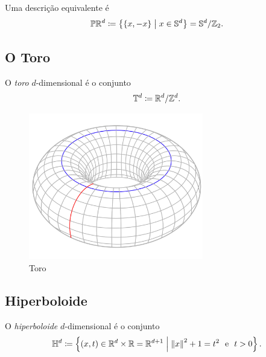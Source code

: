 Uma descrição equivalente é
	\begin{equation*}
	\mathbb{P}\mathbb{R}^d \coloneqq \left\{\{x,-x\} \;\middle\vert\; x \in \mathbb{S}^d \right\} = \mathbb{S}^d/\mathbb{Z}_2.
	\end{equation*}

\subsection{O Toro}

\begin{defi}
	O \emph{toro} $d$-dimensional é o conjunto
	\begin{equation*}
	\mathbb{T}^d \coloneqq \mathbb{R}^d / \mathbb{Z}^d.
	\end{equation*}
\end{defi}

\begin{figure}[!h]
\centering
\includegraphics[width=3in]{./imagens/toro}
\caption{Toro}
\end{figure}

\subsection{Hiperboloide}

\begin{defi}
O \emph{hiperboloide} $d$-dimensional é o conjunto
	\begin{equation*}
	\mathbb{H}^d \coloneqq \left\{(x,t) \in \mathbb{R}^d \times \mathbb{R} = \mathbb{R}^{d+1} \;\middle\vert\; \left\Vert{x}\right\Vert^2+1=t^2 \text{\ \ e\ \ } t>0 \right\}.
	\end{equation*}
\end{defi}



















